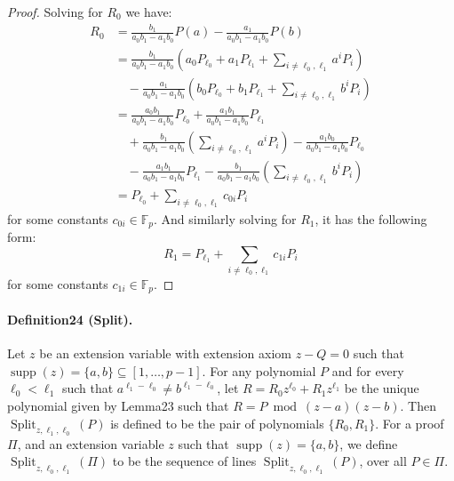 \documentclass[10pt,a4paper]{article}
\DeclareMathOperator{\supp}{supp}
\DeclareMathOperator{\Split}{Split}
\begin{document}
\begin{proof}
Solving for $R_0$ we have:
\begin{align*}
R_0&=\frac{b_1}{a_0b_1-a_1b_0}P(a)-\frac{a_1}{a_0b_1-a_1b_0}P(b)\\
&=\frac{b_1}{a_0b_1-a_1b_0}\left(a_0P_{\ell_0}+a_1P_{\ell_1}+\sum_{i\neq\ell_0,\ell_1}a^iP_i\right)\\
&\quad-\frac{a_1}{a_0b_1-a_1b_0}\left(b_0P_{\ell_0}+b_1P_{\ell_1}+\sum_{i\neq\ell_0,\ell_1}b^iP_i\right)\\
&=\frac{a_0b_1}{a_0b_1-a_1b_0}P_{\ell_0}+\frac{a_1b_1}{a_0b_1-a_1b_0}P_{\ell_1}\\
&\quad+\frac{b_1}{a_0b_1-a_1b_0}\left(\sum_{i\neq\ell_0,\ell_1}a^iP_i\right)-\frac{a_1b_0}{a_0b_1-a_1b_0}P_{\ell_0}\\
&\quad-\frac{a_1b_1}{a_0b_1-a_1b_0}P_{\ell_1}-\frac{b_1}{a_0b_1-a_1b_0}\left(\sum_{i\neq\ell_0,\ell_1}b^iP_i\right)\\
&=P_{\ell_0}+\sum_{i\neq\ell_0,\ell_1}c_{0i}P_i
\end{align*}
for some constants $c_{0i}\in\mathbb F_p$. And similarly solving for $R_1$, it has the following form:
\[R_1=P_{\ell_1}+\sum_{i\neq\ell_0,\ell_1}c_{1i}P_i\]
for some constants $c_{1i}\in\mathbb F_p$.
\end{proof}
\paragraph{Definition24 (Split).} Let $z$ be an extension variable with extension axiom $z-Q=0$ such that $\supp(z)=\{a,b\}\subseteq[1,\ldots,p-1]$. For any polynomial $P$ and for every $\ell_0<\ell_1$ such that $a^{\ell_1-\ell_0}\neq b^{\ell_1-\ell_0}$, let $R=R_0z^{\ell_0}+R_1z^{\ell_1}$ be the unique polynomial given by Lemma23 such that $R=P\bmod(z-a)(z-b)$. Then $\Split_{z,\ell_1,\ell_0}(P)$ is defined to be the pair of polynomials $\{R_0,R_1\}$. For a proof $\Pi$, and an extension variable $z$ such that $\supp(z)=\{a,b\}$, we define $\Split_{z,\ell_0,\ell_1}(\Pi)$ to be the sequence of lines $\Split_{z,\ell_0,\ell_1}(P)$, over all $P\in\Pi$.
\end{document}

